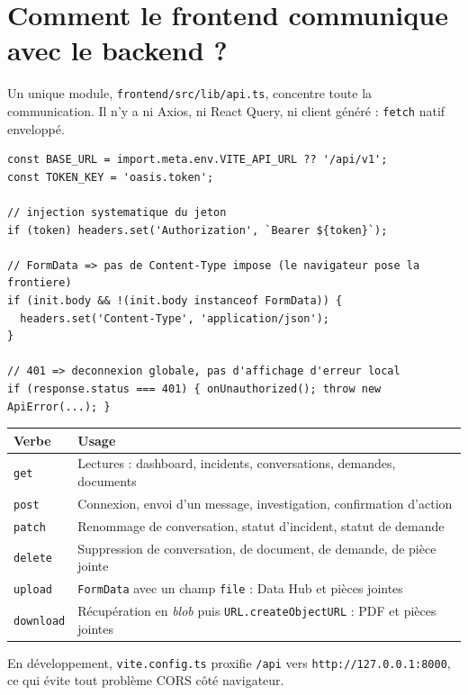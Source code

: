 \documentclass[11pt,a4paper]{report}
\newcommand{\file}[1]{\texttt{\small #1}}
\newcommand{\fn}[1]{\texttt{\small\textcolor{oasisviolet}{#1}}}
\newcommand{\route}[1]{\texttt{\small\textcolor{oasisgreen}{#1}}}
\begin{document}
\section{Comment le frontend communique avec le backend ?}

Un unique module, \file{frontend/src/lib/api.ts}, concentre toute la
communication. Il n'y a ni Axios, ni React Query, ni client généré :
\texttt{fetch} natif enveloppé.

\begin{lstlisting}[caption={Contrat de communication (extraits de lib/api.ts)}]
const BASE_URL = import.meta.env.VITE_API_URL ?? '/api/v1';
const TOKEN_KEY = 'oasis.token';

// injection systematique du jeton
if (token) headers.set('Authorization', `Bearer ${token}`);

// FormData => pas de Content-Type impose (le navigateur pose la frontiere)
if (init.body && !(init.body instanceof FormData)) {
  headers.set('Content-Type', 'application/json');
}

// 401 => deconnexion globale, pas d'affichage d'erreur local
if (response.status === 401) { onUnauthorized(); throw new ApiError(...); }
\end{lstlisting}

\begin{longtable}{@{}p{2.4cm}p{12.5cm}@{}}
\toprule
\textbf{Verbe} & \textbf{Usage}\\
\midrule
\endhead
\fn{get} & Lectures : dashboard, incidents, conversations, demandes, documents\\
\fn{post} & Connexion, envoi d'un message, investigation, confirmation d'action\\
\fn{patch} & Renommage de conversation, statut d'incident, statut de demande\\
\fn{delete} & Suppression de conversation, de document, de demande, de pièce jointe\\
\fn{upload} & \texttt{FormData} avec un champ \texttt{file} : Data Hub et pièces jointes\\
\fn{download} & Récupération en \emph{blob} puis \texttt{URL.createObjectURL} : PDF et pièces jointes\\
\bottomrule
\end{longtable}

\noindent
En développement, \file{vite.config.ts} proxifie \route{/api} vers
\texttt{http://127.0.0.1:8000}, ce qui évite tout problème CORS côté navigateur.
\end{document}

